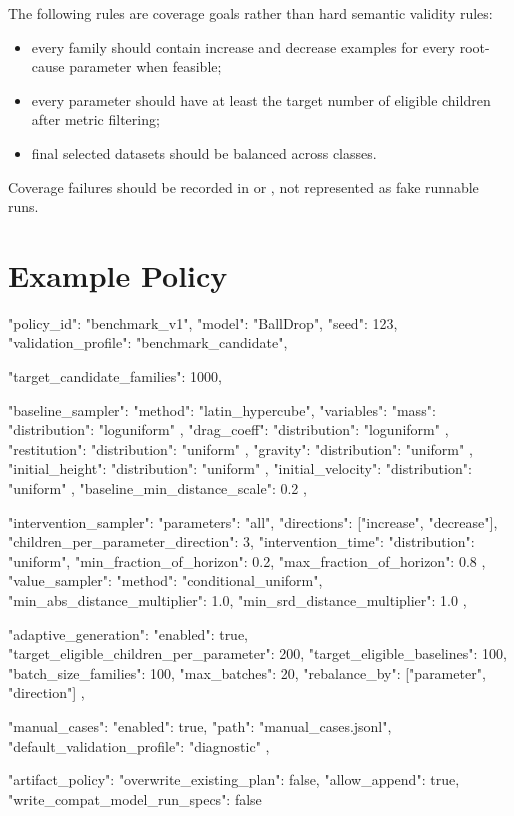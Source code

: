 \documentclass[11pt]{article}
\begin{document}
The following rules are coverage goals rather than hard semantic validity rules:

\begin{itemize}
    \item every family should contain increase and decrease examples for every root-cause parameter when feasible;
    \item every parameter should have at least the target number of eligible children after metric filtering;
    \item final selected datasets should be balanced across classes.
\end{itemize}

Coverage failures should be recorded in  or , not represented as fake runnable runs.

\section*{Example Policy}

\begin{DocCode}
{
  "policy_id": "benchmark_v1",
  "model": "BallDrop",
  "seed": 123,
  "validation_profile": "benchmark_candidate",

  "target_candidate_families": 1000,

  "baseline_sampler": {
    "method": "latin_hypercube",
    "variables": {
      "mass": {
        "distribution": "loguniform"
      },
      "drag_coeff": {
        "distribution": "loguniform"
      },
      "restitution": {
        "distribution": "uniform"
      },
      "gravity": {
        "distribution": "uniform"
      },
      "initial_height": {
        "distribution": "uniform"
      },
      "initial_velocity": {
        "distribution": "uniform"
      }
    },
    "baseline_min_distance_scale": 0.2
  },

  "intervention_sampler": {
    "parameters": "all",
    "directions": ["increase", "decrease"],
    "children_per_parameter_direction": 3,
    "intervention_time": {
      "distribution": "uniform",
      "min_fraction_of_horizon": 0.2,
      "max_fraction_of_horizon": 0.8
    },
    "value_sampler": {
      "method": "conditional_uniform",
      "min_abs_distance_multiplier": 1.0,
      "min_srd_distance_multiplier": 1.0
    }
  },

  "adaptive_generation": {
    "enabled": true,
    "target_eligible_children_per_parameter": 200,
    "target_eligible_baselines": 100,
    "batch_size_families": 100,
    "max_batches": 20,
    "rebalance_by": ["parameter", "direction"]
  },

  "manual_cases": {
    "enabled": true,
    "path": "manual_cases.jsonl",
    "default_validation_profile": "diagnostic"
  },

  "artifact_policy": {
    "overwrite_existing_plan": false,
    "allow_append": true,
    "write_compat_model_run_specs": false
  }
}
\end{DocCode}
\end{document}
